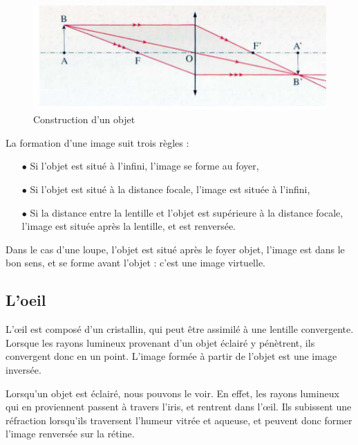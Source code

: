 \documentclass[a4paper, 12pt, onecolumn, openany]{report}
\begin{document}
	\begin{figure}[h]
	\begin{center}
	\includegraphics[scale=0.9]{formation_image.png}
	\end{center}
	\caption{Construction d'un objet}
	\label{Construction d'un objet}
	\end{figure}
		
		La formation d’une image suit trois règles :
		\begin{itemize}
		\item[$\bullet$] Si l’objet est situé à l’infini, l’image se forme au foyer,
		\item[$\bullet$] Si l’objet est situé à la distance focale, l’image est située à l’infini,
		\item[$\bullet$] Si la distance entre la lentille et l’objet est supérieure à la distance focale, l’image est située après la lentille, et est renversée.
		\end{itemize}
		
	Dans le cas d’une loupe, l’objet est situé après le foyer objet, l’image est dans le bon sens, et se forme avant l’objet : c’est une image virtuelle.

\newpage
		\subsection{L'oeil}
		L’œil est composé d’un cristallin, qui peut être assimilé à une lentille convergente. Lorsque les rayons lumineux provenant d’un objet éclairé y pénètrent, ils convergent donc en un point. L’image formée à partir de l’objet est une image inversée.
		
		Lorsqu’un objet est éclairé, nous pouvons le voir. En effet, les rayons lumineux qui en proviennent passent à travers l’iris, et rentrent dans l’œil. Ils subissent une réfraction lorsqu’ils traversent l’humeur vitrée et aqueuse, et peuvent donc former l’image renversée sur la rétine.
		
\end{document}
